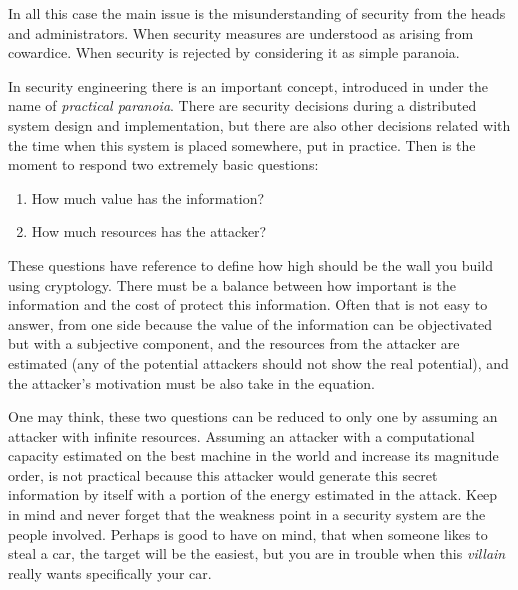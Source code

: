 \documentclass[10pt,a4paper,twoside]{llncs}
\newcommand{\todo}[1]{\texttt{\color{red}TODO:} ``\emph{#1}''}
\begin{document}
In all this case the main issue is the misunderstanding of security from the heads and administrators. When security measures are understood as arising from cowardice. When security is rejected by considering it as simple paranoia.


In security engineering there is an important concept, introduced in \cite{PractCryptoSchneier} under the name of \emph{practical paranoia}. There are security decisions during a distributed system design and implementation, but there are also other decisions related with the time when this system is placed somewhere, put in practice. Then is the moment to respond two extremely basic questions: 

\begin{enumerate}
    \item How much value has the information?
    \item How much resources has the attacker?
\end{enumerate}

These questions have reference to define how high should be the wall you build using cryptology. There must be a balance between how important is the information and the cost of protect this information. Often that is not easy to answer, from one side because the value of the information can be objectivated but with a subjective component, and the resources from the attacker are estimated (any of the potential attackers should not show the real potential), and the attacker's motivation must be also take in the equation.

One may think, these two questions can be reduced to only one by assuming an attacker with infinite resources. Assuming an attacker with a computational capacity estimated on the best machine in the world and increase its magnitude order, is not practical because this attacker would generate this secret information by itself with a portion of the energy estimated in the attack. Keep in mind and never forget that the weakness point in a security system are the people involved. Perhaps is good to have on mind, that when someone likes to steal a car, the target will be the easiest, but you are in trouble when this \emph{villain} really wants specifically your car.
\end{document}
